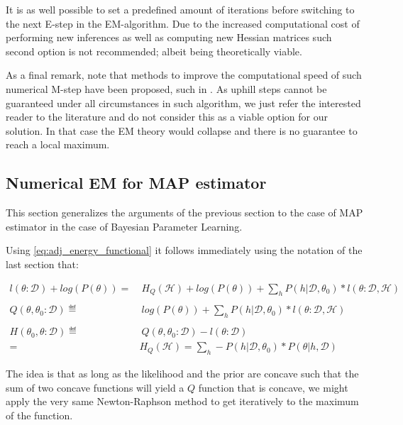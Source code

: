 \documentclass[11pt]{article}
\begin{document}
\begin{article}
It is as well possible to set a predefined amount of iterations
before switching to the next E-step in the EM-algorithm. Due to the
increased computational cost of performing new inferences as well
as computing new Hessian matrices such second option is not
recommended; albeit being theoretically viable.

As a final remark, note that methods to improve the computational
speed of such numerical M-step have been proposed, such in
\cite{Louis_1982}. As uphill steps cannot be guaranteed under all
circumstances in such algorithm, we just refer the interested
reader to the literature and do not consider this as a viable
option for our solution. In that case the EM theory would collapse
and there is no guarantee to reach a local maximum.

\subsection{Numerical EM for MAP estimator}
\label{sec:org26b8c37}

This section generalizes the arguments of the previous section to
the case of MAP estimator in the case of Bayesian Parameter
Learning.

Using \ref{eq:adj_energy_functional} it follows immediately using the
notation of the last section that:

\begin{align} \label{eq:likelihood_energy_map_iterative}
l (\theta: \mathscr{D}) + log(P(\theta)) =& \ H_Q (\mathscr {H}) + log(P(\theta)) + \sum_h P(h | \mathscr{D}, \theta_0) * l (\theta: \mathscr{D}, \mathscr{H})\\
\nonumber\\
Q(\theta, \theta_0 : \mathscr{D}) \eqdef& \ log(P(\theta)) + \sum_h P(h | \mathscr{D}, \theta_0) * l (\theta: \mathscr{D}, \mathscr{H})\\
\nonumber\\  
H(\theta_0, \theta: \mathscr{D}) \eqdef& \ Q(\theta, \theta_0 : \mathscr{D}) - l (\theta: \mathscr{D}) \\
                                 =& H_Q (\mathscr {H}) = \sum_h - P(h | \mathscr{D}, \theta_0) * P(\theta | h, \mathscr{D}) \nonumber
\end{align}

The idea is that as long as the likelihood and the prior are
concave such that the sum of two concave functions will yield a \(Q\)
function that is concave, we might apply the very same
Newton-Raphson method to get iteratively to the maximum of the
function.


\end{article}
\end{document}
